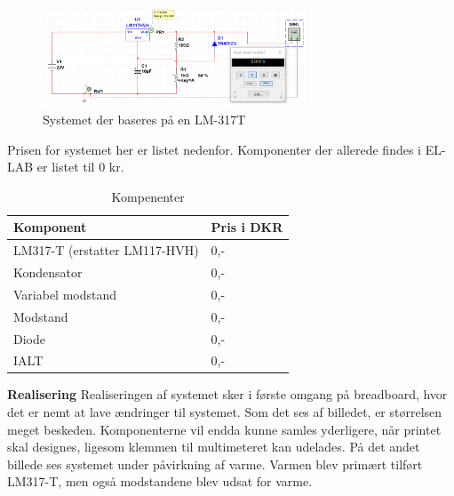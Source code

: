 \begin{figure}[h]
  \centering
  \includegraphics[width=0.7\textwidth]{bil1.png}
  \caption{Systemet der baseres på en LM-317T}
  \label{fig:bil1}
\end{figure}

Prisen for systemet her er listet nedenfor. Komponenter der allerede findes i EL-LAB er listet til 0 kr.
\begin{table}[h]
  \centering
\begin{tabular}{ll}
\hline
Komponent & Pris i DKR \\
\hline
LM317-T (erstatter LM117-HVH) & 0,- \\
\hline
Kondensator & 0,- \\
\hline
Variabel modstand & 0,- \\
\hline
Modstand & 0,- \\
\hline
Diode & 0,- \\
\hline
IALT & 0,- \\
\hline
\end{tabular}
  \caption{Kompenenter}
  \label{tab:komp}
\end{table}

\clearpage
\textbf{Realisering}\newline
Realiseringen af systemet sker i første omgang på breadboard, hvor det er nemt at lave ændringer til systemet. Som det ses af billedet, er størrelsen meget beskeden. Komponenterne vil endda kunne samles yderligere, når printet skal designes, ligesom klemmen til multimeteret kan udelades.
På det andet billede ses systemet under påvirkning af varme. Varmen blev primært tilført LM317-T, men også modstandene blev udsat for varme.

